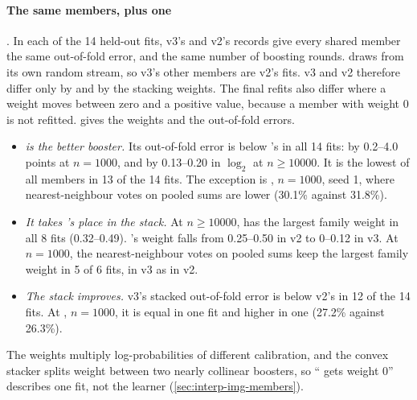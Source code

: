 \paragraph{The same members, plus one} . In each of the 14 held-out fits, v3's and v2's records give every shared member the same out-of-fold error, and  the same number of boosting rounds.  draws from its own random stream, so v3's other members are v2's fits. v3 and v2 therefore differ only by  and by the stacking weights. The final refits also differ where a weight moves between zero and a positive value, because a member with weight 0 is not refitted.  gives the weights and the out-of-fold errors.
\begin{itemize}
\item \emph{ is the better booster.} Its out-of-fold error is below 's in all 14 fits: by 0.2--4.0 points at $n=1000$, and by 0.13--0.20 in $\log_2$ at $n\ge10000$. It is the lowest of all members in 13 of the 14 fits. The exception is , $n=1000$, seed 1, where nearest-neighbour votes on pooled sums are lower (30.1\% against 31.8\%).
\item \emph{It takes 's place in the stack.} At $n\ge10000$,  has the largest family weight in all 8 fits (0.32--0.49). 's weight falls from 0.25--0.50 in v2 to 0--0.12 in v3. At $n=1000$, the nearest-neighbour votes on pooled sums keep the largest family weight in 5 of 6 fits, in v3 as in v2.
\item \emph{The stack improves.} v3's stacked out-of-fold error is below v2's in 12 of the 14 fits. At , $n=1000$, it is equal in one fit and higher in one (27.2\% against 26.3\%).
\end{itemize}
The weights multiply log-probabilities of different calibration, and the convex stacker splits weight between two nearly collinear boosters, so `` gets weight 0'' describes one fit, not the learner (\cref{sec:interp-img-members}).

